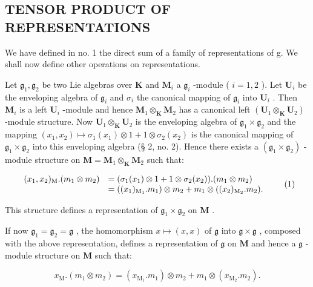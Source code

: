 \subsection{TENSOR PRODUCT OF REPRESENTATIONS}

We have defined in no. 1 the direct sum of a family of representations of g. We shall now define other operations on representations.

Let \(\mathfrak{g}_1, \mathfrak{g}_2\) be two Lie algebras over \(\mathbf{K}\) and \(\mathbf{M}_i\) a \(\mathfrak{g}_i\) -module ( \(i = 1, 2\) ). Let \(\mathbf{U}_i\) be the enveloping algebra of \(\mathfrak{g}_i\) and \(\sigma_i\) the canonical mapping of \(\mathfrak{g}_i\) into \(\mathbf{U}_i\) . Then \(\mathbf{M}_i\) is a left \(\mathbf{U}_i\) -module and hence \(\mathbf{M}_1 \otimes_{\mathbf{K}} \mathbf{M}_2\) has a canonical left \((\mathbf{U}_1 \otimes_{\mathbf{K}} \mathbf{U}_2)\) -module structure. Now \(\mathbf{U}_1 \otimes_{\mathbf{K}} \mathbf{U}_2\) is the enveloping algebra of \(\mathfrak{g}_1 \times \mathfrak{g}_2\) and the mapping \((x_1, x_2) \mapsto \sigma_1(x_1) \otimes 1 + 1 \otimes \sigma_2(x_2)\) is the canonical mapping of \(\mathfrak{g}_1 \times \mathfrak{g}_2\) into this enveloping algebra (§ 2, no. 2). Hence there exists a \((\mathfrak{g}_1 \times \mathfrak{g}_2)\) -module structure on \(\mathbf{M} = \mathbf{M}_1 \otimes_{\mathbf{K}} \mathbf{M}_2\) such that:

\[
\begin{array}{r l} (x _ {1}, x _ {2}) _ {\mathrm{M}}. (m _ {1} \otimes m _ {2}) & = (\sigma_ {1} (x _ {1}) \otimes 1 + 1 \otimes \sigma_ {2} (x _ {2})) . (m _ {1} \otimes m _ {2}) \\ & = ((x _ {1}) _ {\mathrm{M} _ {1}}. m _ {1}) \otimes m _ {2} + m _ {1} \otimes ((x _ {2}) _ {\mathrm{M} _ {2}}. m _ {2}). \end{array}\tag{1}
\]

This structure defines a representation of \(\mathfrak{g}_1\times \mathfrak{g}_2\) on \(\mathbf{M}\) .

If now \(\mathfrak{g}_1 = \mathfrak{g}_2 = \mathfrak{g}\) , the homomorphism \(x \mapsto (x, x)\) of \(\mathfrak{g}\) into \(\mathfrak{g} \times \mathfrak{g}\) , composed with the above representation, defines a representation of \(\mathfrak{g}\) on \(\mathbf{M}\) and hence a \(\mathfrak{g}\) -module structure on \(\mathbf{M}\) such that:

\[
x _ {\mathrm{M}}. (m _ {1} \otimes m _ {2}) = (x _ {\mathrm{M} _ {1}}. m _ {1}) \otimes m _ {2} + m _ {1} \otimes (x _ {\mathrm{M} _ {2}}. m _ {2}).\tag{2}
\]

